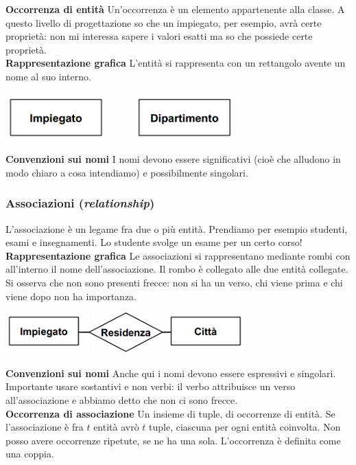 \noindent \textbf{Occorrenza di entità} Un'occorrenza è un elemento appartenente alla classe. A questo livello di progettazione so che un impiegato, per esempio, avrà certe proprietà: non mi interessa sapere i valori esatti ma so che possiede certe proprietà.\\
\textbf{Rappresentazione grafica} L'entità si rappresenta con un rettangolo avente un nome al suo interno.\begin{center}\includegraphics{images/5.PNG}\end{center}
\textbf{Convenzioni sui nomi} I nomi devono essere significativi (cioè che alludono in modo chiaro a cosa intendiamo) e possibilmente singolari.
\subsubsection{Associazioni (\emph{relationship})}
L'associazione è un legame fra due o più entità. Prendiamo per esempio studenti, esami e insegnamenti. Lo studente svolge un esame per un certo corso!	\\	

\noindent \textbf{Rappresentazione grafica} Le associazioni si rappresentano mediante rombi con all'interno il nome dell'associazione. Il rombo è collegato alle due entità collegate. Si osserva che non sono presenti frecce: non si ha un verso, chi viene prima e chi viene dopo non ha importanza.\begin{center}\includegraphics{images/6.PNG}\end{center}
\textbf{Convenzioni sui nomi} Anche qui i nomi devono essere espressivi e singolari. Importante usare sostantivi e non verbi: il verbo attribuisce un verso all'associazione e abbiamo detto che non ci sono frecce.\\
\textbf{Occorrenza di associazione} Un insieme di tuple, di occorrenze di entità. Se l'associazione è fra $t$ entità avrò $t$ tuple, ciascuna per ogni entità coinvolta. Non posso avere occorrenze ripetute, se ne ha una sola. L'occorrenza è definita come una coppia.
